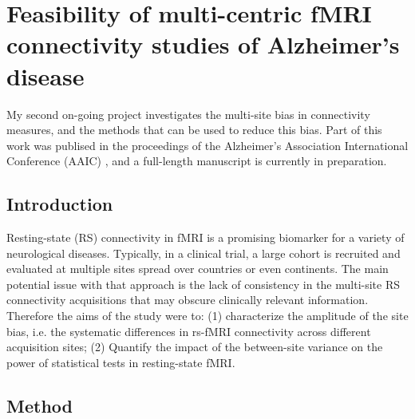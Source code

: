 
\chapter{Feasibility of multi-centric fMRI connectivity studies of Alzheimer's disease}

My second on-going project investigates the multi-site bias in connectivity measures, and the methods that can be used to reduce this bias. Part of this work was publised in the proceedings of the Alzheimer's Association International Conference (AAIC) \cite{Dansereau2013}, and a full-length manuscript is currently in preparation. 

\section{Introduction}
Resting-state (RS) connectivity in fMRI is a promising biomarker for a variety of neurological diseases. Typically, in a clinical trial, a large cohort is recruited and evaluated at multiple sites spread over countries or even continents. The main potential issue with that approach is the lack of consistency in the multi-site RS connectivity acquisitions that may obscure clinically relevant information. Therefore the aims of the study were to: (1) characterize the amplitude of the site bias, i.e. the systematic differences in rs-fMRI connectivity across different acquisition sites; (2) Quantify the impact of the between-site variance on the power of statistical tests in resting-state fMRI.

\section{Method}

